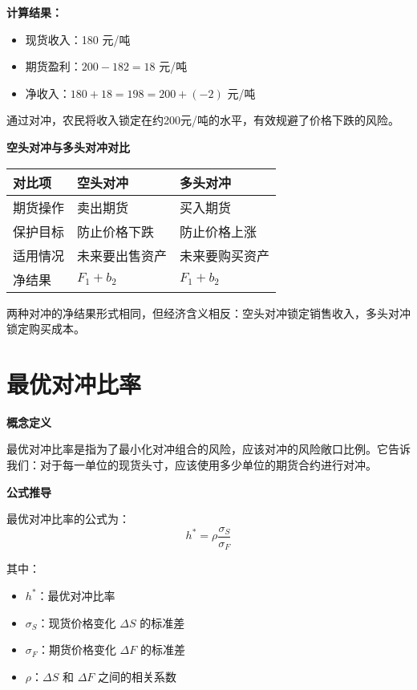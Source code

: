 \textbf{计算结果：}
\begin{itemize}
    \item 现货收入：180 元/吨
    \item 期货盈利：$200 - 182 = 18$ 元/吨
    \item 净收入：$180 + 18 = 198 = 200 + (-2)$ 元/吨
\end{itemize}

通过对冲，农民将收入锁定在约200元/吨的水平，有效规避了价格下跌的风险。


\textbf{空头对冲与多头对冲对比}

\begin{table}[h]
\centering
\begin{tabular}{|l|l|l|}
\hline
\textbf{对比项} & \textbf{空头对冲} & \textbf{多头对冲} \\
\hline
期货操作 & 卖出期货 & 买入期货 \\
\hline
保护目标 & 防止价格下跌 & 防止价格上涨 \\
\hline
适用情况 & 未来要出售资产 & 未来要购买资产 \\
\hline
净结果 & $F_1 + b_2$ & $F_1 + b_2$ \\
\hline
\end{tabular}
\end{table}

两种对冲的净结果形式相同，但经济含义相反：空头对冲锁定销售收入，多头对冲锁定购买成本。



\section{最优对冲比率}

\textbf{概念定义}

最优对冲比率是指为了最小化对冲组合的风险，应该对冲的风险敞口比例。它告诉我们：对于每一单位的现货头寸，应该使用多少单位的期货合约进行对冲。

\textbf{公式推导}

最优对冲比率的公式为：
\begin{equation}
h^* = \rho \frac{\sigma_S}{\sigma_F}
\end{equation}

其中：
\begin{itemize}
    \item $h^*$：最优对冲比率
    \item $\sigma_S$：现货价格变化 $\Delta S$ 的标准差
    \item $\sigma_F$：期货价格变化 $\Delta F$ 的标准差
    \item $\rho$：$\Delta S$ 和 $\Delta F$ 之间的相关系数
\end{itemize}

